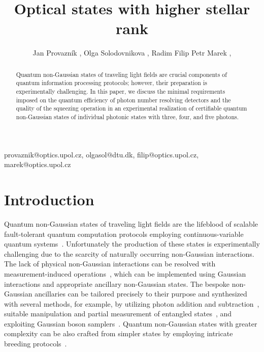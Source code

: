 \documentclass{optica-article}
\begin{document}
\title
  {Optical states with higher stellar rank}
\author
  {
    {Jan Provazn\'{i}k} ,
    {Olga Solodovnikova} ,
    {Radim Filip} 
    {Petr Marek} ,
  }
\address
  {
     {Department of Optics, Palack\'{y} University, 17. listopadu 1192/12, 771 46 Olomouc, Czech Republic} \\
     {Center for Macroscopic Quantum States (bigQ), Department of Physics, Technical University of Denmark, Building 307, Fysikvej, 2800 Kgs. Lyngby, Denmark}
  }
  
\email
  {
    \authormark{$\bigstar$}
      {provaznik@optics.upol.cz},
    \authormark{$\bullet$} 
      {olgasol@dtu.dk},
    \authormark{$\dagger$} 
      {filip@optics.upol.cz},
    \authormark{$\ddagger$} 
      {marek@optics.upol.cz}
  }

\begin{abstract}\noindent
  Quantum non-Gaussian states of traveling light fields are crucial components of quantum information processing protocols; however, their preparation is experimentally challenging. In this paper, we discuss the minimal requirements imposed on the quantum efficiency of photon number resolving detectors and the quality of the squeezing operation in an experimental realization of certifiable quantum non-Gaussian states of individual photonic states with three, four, and five photons.
\end{abstract}

%

\section{Introduction}

Quantum non-Gaussian states of traveling light fields are the lifeblood of scalable fault-tolerant quantum computation protocols employing continuous-variable quantum systems~\cite{lloyd1999,gottesman2001,menicucci2014,baragiola2019,bourassa2021,madsen2022,aghaeerad2025}. Unfortunately the production of these states is experimentally challenging due to the scarcity of naturally occurring non-Gaussian interactions. The lack of physical non-Gaussian interactions can be resolved with measurement-induced operations~\cite{filip2005,marek2009,marek2011,yukawa2013b,miyata2016,marek2018a,sakaguchi2023}, which can be implemented using Gaussian interactions and appropriate ancillary non-Gaussian states. The bespoke non-Gaussian ancillaries can be tailored precisely to their purpose and synthesized with several methods, for example, by utilizing photon addition and subtraction~\cite{dakna1999,fiurasek2005,eaton2019,takase2021,endo2023}, suitable manipulation and partial measurement of entangled states~\cite{yukawa2013a,yoshikawa2018,tiedau2019,provaznik2020}, and exploiting Gaussian boson samplers~\cite{su2019,quesada2019}. Quantum non-Gaussian states with greater complexity can be also crafted from simpler states by employing intricate breeding protocols~\cite{weigand2018,eaton2022,zheng2023,takase2024,aghaeerad2025}.
\end{document}
